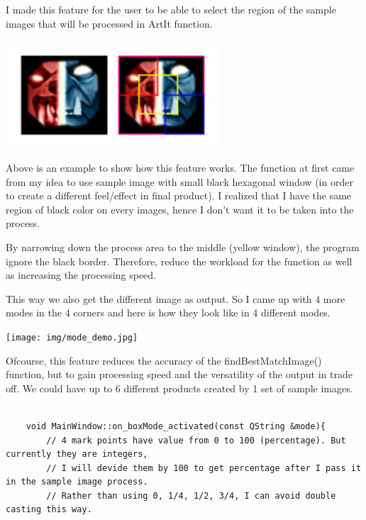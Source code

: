 \documentclass[english]{article}
\begin{document}
{I made this feature for the user to be able to select the region of the sample images that will be processed in ArtIt function.\newline


\begin{center}
	\includegraphics[width=8cm,height=4cm]{img/mode_explain.jpg}	
\end{center} 


Above is an example to show how this feature works. The function at first came from my idea to use sample image with small black hexagonal window (in order to create a different feel/effect in final product). I realized that I have the same region of black color on every images, hence I don't want it to be taken into the process.\newline

By narrowing down the process area to the middle (yellow window), the program ignore the black border. Therefore, reduce the workload for the function as well as increasing the processing speed. \newline

This way we also get the different image as output. So I came up with 4 more modes in the 4 corners and here is how they look like in 4 different modes.

\begin{center}
	\texttt{[image: img/mode\_demo.jpg]}	
\end{center}  


Ofcourse, this feature reduces the accuracy of the findBestMatchImage() function, but to gain processing speed and the versatility of the output in trade off. We could have up to 6 different products created by 1 set of sample images.

\lstset{language=C++}
\begin{lstlisting}

	void MainWindow::on_boxMode_activated(const QString &mode){
		// 4 mark points have value from 0 to 100 (percentage). But currently they are integers,
		// I will devide them by 100 to get percentage after I pass it in the sample image process.
		// Rather than using 0, 1/4, 1/2, 3/4, I can avoid double casting this way.
		

\end{lstlisting}}
\end{document}
